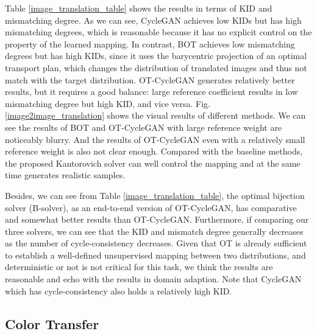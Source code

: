 \documentclass[runningheads]{llncs}
\begin{document}
Table \ref{image_translation_table} shows the results in terms of KID and mismatching degree. As we can see, CycleGAN achieves low KIDs but has high mismatching degrees, which is reasonable because it has no explicit control on the property of the learned mapping. In contrast, BOT achieves low mismatching degrees but has high KIDs, since it uses the barycentric projection of an optimal transport plan, which changes the distribution of translated images and thus not match with the target distribution. OT-CycleGAN generates relatively better results, but it requires a good balance: large reference coefficient results in low mismatching degree but high KID, and vice versa. Fig. \ref{image2image_translation} shows the visual results of different methods. We can see the results of BOT and OT-CycleGAN with large reference weight are noticeably blurry. And the results of OT-CycleGAN even with a relatively small reference weight is also not clear enough. Compared with the baseline methods, the proposed Kantorovich solver can well control the mapping and at the same time generates realistic samples. 

Besides, we can see from Table \ref{image_translation_table}, the optimal bijection solver (B-solver), as an end-to-end version of OT-CycleGAN, has comparative and somewhat better results than OT-CycleGAN. Furthermore, if comparing our three solvers, we can see that the KID and mismatch degree generally decreases as the number of cycle-consistency decreases. Given that OT is already sufficient to establish a well-defined unsupervised mapping between two distributions, and deterministic or not is not critical for this task, we think the results are reasonable and echo with the results in domain adaption. Note that CycleGAN which has cycle-consistency also holds a relatively high KID. 

\subsection{Color Transfer}
\end{document}

